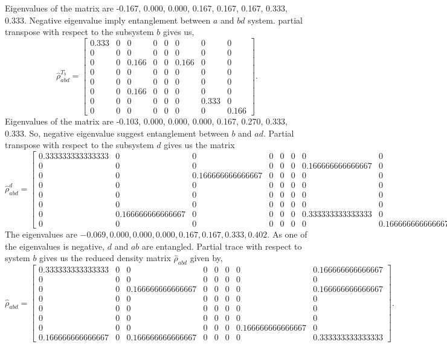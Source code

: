 \documentclass{amsart}
\theoremstyle{plain}
\theoremstyle{definition}
\theoremstyle{plain}
\begin{document}
Eigenvalues of the matrix are -0.167, 0.000, 0.000, 0.167, 0.167, 0.167, 0.333, 0.333. Negative eigenvalue imply entanglement between $a$ and $bd$ system. partial transpose with respect to the subsystem $b$ gives us,
\begin{equation*}
	\hat{\rho}_{abd}^{T_b} = \left[\begin{matrix}0.333 & 0 & 0 & 0 & 0 & 0 & 0 & 0\\0 & 0 & 0 & 0 & 0 & 0 & 0 & 0\\0 & 0 & 0.166 & 0 & 0 & 0.166 & 0 & 0\\0 & 0 & 0 & 0 & 0 & 0 & 0 & 0\\0 & 0 & 0 & 0 & 0 & 0 & 0 & 0\\0 & 0 & 0.166 & 0 & 0 & 0 & 0 & 0\\0 & 0 & 0 & 0 & 0 & 0 & 0.333 & 0\\0 & 0 & 0 & 0 & 0 & 0 & 0 & 0.166\end{matrix}\right].
\end{equation*}
Eigenvalues of the matrix are -0.103, 0.000, 0.000, 0.000, 0.167, 0.270, 0.333, 0.333. So, negative eigenvalue suggest entanglement between $b$ and $ad$.
Partial transpose with respect to the subsystem $d$ gives us the matrix
\begin{equation*}
	\hat{\rho}_{abd}^{d} = \left[\begin{matrix}0.333333333333333 & 0 & 0 & 0 & 0 & 0 & 0 & 0\\0 & 0 & 0 & 0 & 0 & 0 & 0.166666666666667 & 0\\0 & 0 & 0.166666666666667 & 0 & 0 & 0 & 0 & 0\\0 & 0 & 0 & 0 & 0 & 0 & 0 & 0\\0 & 0 & 0 & 0 & 0 & 0 & 0 & 0\\0 & 0 & 0 & 0 & 0 & 0 & 0 & 0\\0 & 0.166666666666667 & 0 & 0 & 0 & 0 & 0.333333333333333 & 0\\0 & 0 & 0 & 0 & 0 & 0 & 0 & 0.166666666666667\end{matrix}\right].
\end{equation*}
The eigenvalues are $-0.069, 0.000, 0.000, 0.000, 0.167, 0.167, 0.333, 0.402$. As one of the eigenvalues is negative, $d$ and $ab$ are entangled.
Partial trace with respect to system $b$ gives us the reduced density matrix $\hat{\rho}_{abd}$ given by,
\begin{equation*}
	\hat{\rho}_{abd} =\left[\begin{matrix}0.333333333333333 & 0 & 0 & 0 & 0 & 0 & 0 & 0.166666666666667\\0 & 0 & 0 & 0 & 0 & 0 & 0 & 0\\0 & 0 & 0.166666666666667 & 0 & 0 & 0 & 0 & 0.166666666666667\\0 & 0 & 0 & 0 & 0 & 0 & 0 & 0\\0 & 0 & 0 & 0 & 0 & 0 & 0 & 0\\0 & 0 & 0 & 0 & 0 & 0 & 0 & 0\\0 & 0 & 0 & 0 & 0 & 0 & 0.166666666666667 & 0\\0.166666666666667 & 0 & 0.166666666666667 & 0 & 0 & 0 & 0 & 0.333333333333333\end{matrix}\right]
	.
\end{equation*}
\end{document}
